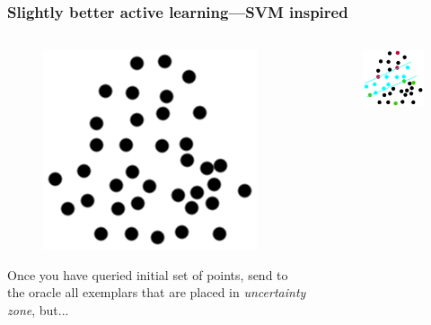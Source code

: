 \documentclass{beamer}
\begin{document}
  \begin{frame}
    \frametitle{Slightly better active learning---SVM inspired}
    \begin{columns}
      \begin{column}{5cm}
        \begin{figure}
          \includegraphics[scale=.25]{graphics/presentation/clusters2} 
        \end{figure}
        Once you have queried initial set of points, send to the oracle all exemplars that are placed in \emph{uncertainty zone}, but...\\
      \end{column}
      \begin{column}{5cm}
        \begin{figure}
          \includegraphics[scale=.5]{graphics/presentation/al1c} 
        \end{figure}
      \end{column}
    \end{columns}
  \end{frame}
\end{document}
